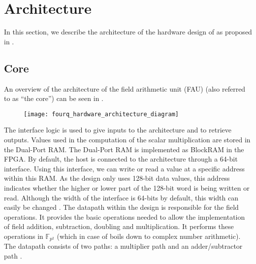\section{Architecture}
In this section, we describe the architecture of the hardware design of {\fourq} as proposed in \cite{jarvinen2016four}.

\subsection{Core}
An overview of the architecture of the field arithmetic unit (FAU) (also referred to as ``the core'') can be seen in .
%
\begin{figure}
	\centering
	\texttt{[image: fourq\_hardware\_architecture\_diagram]}
	
	\label{fig: fourQ hardware architectural diagram}
\end{figure}
%
The interface logic is used to give inputs to the architecture and to retrieve outputs.
Values used in the computation of the scalar multiplication are stored in the Dual-Port RAM.
The Dual-Port RAM is implemented as BlockRAM in the FPGA. 
By default, the host is connected to the architecture through a 64-bit interface.
Using this interface, we can write or read a value at a specific address within this RAM.
As the design only uses 128-bit data values, this address indicates whether the higher or lower part of the 128-bit word is being written or read.
Although the width of the interface is 64-bits by default, this width can easily be changed \cite{jarvinen2016four}.
The datapath within the design is responsible for the field operations.
It provides the basic operations needed to allow the implementation of field addition, subtraction, doubling and multiplication.
It performs these operations in $\mathbb{F}_{p^2}$ (which in case of {\fourq} boils down to complex number arithmetic).
The datapath consists of two paths: a multiplier path and an adder/subtractor path \cite{jarvinen2016four}.
%
